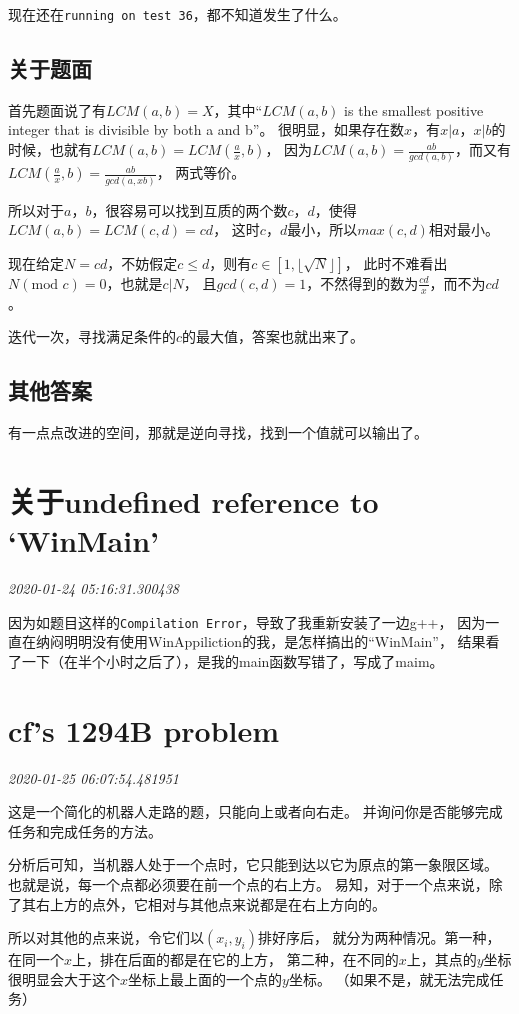 \documentclass{peterlitsdoc}
\newcommand{\timetx}[1]
    {\par\noindent\emph{\pltgray\small #1}\vspace{2em}}
\newcommand{\vb}{\verb}
\begin{document}
现在还在\vb|running on test 36|，都不知道发生了什么。

\subsection{关于题面}
首先题面说了有$LCM(a,b)=X$，其中``$LCM(a,b)$ is the smallest positive integer
that is divisible by both a and b''。
很明显，如果存在数$x$，有$x|a$，$x|b$的时候，也就有$LCM(a,b)=LCM(\frac{a}{x},b)$，
因为$LCM(a,b)=\frac{ab}{gcd(a,b)}$，而又有$LCM(\frac{a}{x},b)=\frac{ab}{gcd(a,xb)}$，
两式等价。

所以对于$a$，$b$，很容易可以找到互质的两个数$c$，$d$，使得$LCM(a,b)=LCM(c,d)=cd$，
这时$c$，$d$最小，所以$max(c,d)$相对最小。

现在给定$N=cd$，不妨假定$c\le d$，则有$c\in [1,\lfloor\sqrt{N}\rfloor]$，
此时不难看出$N(\text{mod }c)=0$，也就是$c|N$，
且$gcd(c,d)=1$，不然得到的数为$\frac{cd}{x}$，而不为$cd$。

迭代一次，寻找满足条件的$c$的最大值，答案也就出来了。

\subsection{其他答案}
有一点点改进的空间，那就是逆向寻找，找到一个值就可以输出了。


\section{关于undefined reference to `WinMain'}\timetx{2020-01-24 05:16:31.300438}

因为如题目这样的\vb|Compilation Error|，导致了我重新安装了一边g++，
因为一直在纳闷明明没有使用WinAppiliction的我，是怎样搞出的``WinMain''，
结果看了一下（在半个小时之后了），是我的main函数写错了，写成了maim。


\section{cf's 1294B problem}\timetx{2020-01-25 06:07:54.481951}

这是一个简化的机器人走路的题，只能向上或者向右走。
并询问你是否能够完成任务和完成任务的方法。

分析后可知，当机器人处于一个点时，它只能到达以它为原点的第一象限区域。
也就是说，每一个点都必须要在前一个点的右上方。
易知，对于一个点来说，除了其右上方的点外，它相对与其他点来说都是在右上方向的。

所以对其他的点来说，令它们以$(x_i, y_i)$排好序后，
就分为两种情况。第一种，在同一个$x$上，排在后面的都是在它的上方，
第二种，在不同的$x$上，其点的$y$坐标很明显会大于这个$x$坐标上最上面的一个点的$y$坐标。
（如果不是，就无法完成任务）
\end{document}
